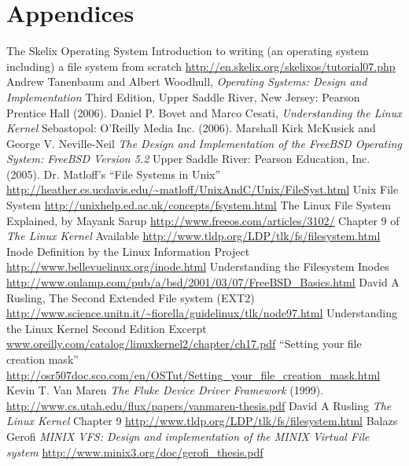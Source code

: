 \documentclass[oneside]{book}
\begin{document}
\part{Appendices}
\appendix

\backmatter 
\begin{thebibliography}{10}
 The Skelix Operating System Introduction to writing (an operating system including) a file system from scratch \url{http://en.skelix.org/skelixos/tutorial07.php}
 Andrew Tanenbaum and Albert Woodhull, \textit{Operating Systems: Design and Implementation} Third Edition, Upper Saddle River, New Jersey: Pearson Prentice Hall (2006).
 Daniel P. Bovet and Marco Cesati, \textit{Understanding the Linux Kernel} Sebastopol: O'Reilly Media Inc. (2006).
 Marshall Kirk McKusick and George V. Neville-Neil \textit{The Design and Implementation of the FreeBSD Operating System: FreeBSD Version 5.2} Upper Saddle River: Pearson Education, Inc. (2005).
 Dr. Matloff's ``File Systems in Unix'' \url{http://heather.cs.ucdavis.edu/~matloff/UnixAndC/Unix/FileSyst.html} 
 Unix File System \url{http://unixhelp.ed.ac.uk/concepts/fsystem.html}
 The Linux File System Explained, by Mayank Sarup \url{http://www.freeos.com/articles/3102/}
 Chapter 9 of \textit{The Linux Kernel} Available \url{http://www.tldp.org/LDP/tlk/fs/filesystem.html}
 Inode Definition by the Linux Information Project \url{http://www.bellevuelinux.org/inode.html}
 Understanding the Filesystem Inodes \url{http://www.onlamp.com/pub/a/bsd/2001/03/07/FreeBSD_Basics.html}
 David A Rusling, The Second Extended File system (EXT2) \url{http://www.science.unitn.it/~fiorella/guidelinux/tlk/node97.html}
 Understanding the Linux Kernel Second Edition Excerpt \url{www.oreilly.com/catalog/linuxkernel2/chapter/ch17.pdf}
 ``Setting your file creation mask'' \url{http://osr507doc.sco.com/en/OSTut/Setting_your_file_creation_mask.html}
 Kevin T. Van Maren \textit{The Fluke Device Driver Framework} (1999). \url{http://www.cs.utah.edu/flux/papers/vanmaren-thesis.pdf}
 David A Rusling \textit{The Linux Kernel} Chapter 9 \url{http://www.tldp.org/LDP/tlk/fs/filesystem.html}
 Balazs Gerofi \textit{MINIX VFS: Design and implementation of the MINIX Virtual File system} \url{http://www.minix3.org/doc/gerofi_thesis.pdf}

\end{thebibliography}
\end{document}
